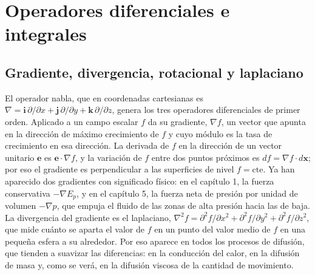 \documentclass[10pt,openany]{book}
\begin{document}
\chapter{Operadores diferenciales e integrales}
\label{chap:c11}


\section{Gradiente, divergencia, rotacional y laplaciano}

El operador nabla, que en coordenadas cartesianas es \(\nabla = \mathbf{i}\,\partial/\partial x + \mathbf{j}\,\partial/\partial y + \mathbf{k}\,\partial/\partial z\), genera los tres operadores diferenciales de primer orden. Aplicado a un campo escalar \(f\) da su gradiente, \(\nabla f\), un vector que apunta en la dirección de máximo crecimiento de \(f\) y cuyo módulo es la tasa de crecimiento en esa dirección. La derivada de \(f\) en la dirección de un vector unitario \(\mathbf{e}\) es \(\mathbf{e}\cdot\nabla f\), y la variación de \(f\) entre dos puntos próximos es \(df = \nabla f\cdot d\mathbf{x}\); por eso el gradiente es perpendicular a las superficies de nivel \(f = \mathrm{cte}\). Ya han aparecido dos gradientes con significado físico: en el capítulo 1, la fuerza conservativa \(-\nabla E_p\), y en el capítulo 5, la fuerza neta de presión por unidad de volumen \(-\nabla p\), que empuja el fluido de las zonas de alta presión hacia las de baja. La divergencia del gradiente es el laplaciano, \(\nabla^{2}f = \partial^{2}f/\partial x^{2} + \partial^{2}f/\partial y^{2} + \partial^{2}f/\partial z^{2}\), que mide cuánto se aparta el valor de \(f\) en un punto del valor medio de \(f\) en una pequeña esfera a su alrededor. Por eso aparece en todos los procesos de difusión, que tienden a suavizar las diferencias: en la conducción del calor, en la difusión de masa y, como se verá, en la difusión viscosa de la cantidad de movimiento.
\end{document}
